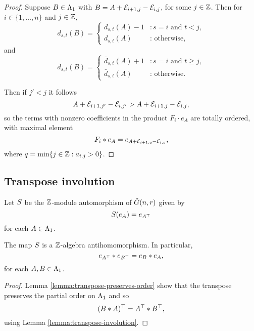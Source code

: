 \documentclass[a4paper, 11pt]{report}
\begin{document}
\begin{proof}
Suppose $B\in\Lambda_1{}$ with $B=A+\mathcal{E}_{i+1,j}-\mathcal{E}_{i,j}$, for some $j\in\mathbb{Z}$. Then for $i\in\{1,\ldots,n\}$ and $j\in\mathbb{Z}$,
\begin{equation*}
d_{s,t}{(B)} = \begin{cases}
d_{s,t}{(A)} - 1 &: s=i \text{ and } t<j,\\
d_{s,t}{(A)} &: \text{ otherwise,}
\end{cases}
\end{equation*}
and
\begin{equation*}
\bar{d}_{s,t}{(B)} = \begin{cases}
\bar{d}_{s,t}{(A)} + 1 &: s=i \text{ and } t\geq j,\\
\bar{d}_{s,t}{(A)} &: \text{ otherwise.}
\end{cases}
\end{equation*}

Then if $j'<j$ it follows
\begin{equation*}
A+\mathcal{E}_{i+1,j'}-\mathcal{E}_{i,j'} > A+\mathcal{E}_{i+1,j}-\mathcal{E}_{i,j},
\end{equation*}
so the terms with nonzero coefficients in the product $F_i\cdot e_A$ are totally ordered, with maximal element
\begin{equation*}
F_i\ast e_A = e_{A+\mathcal{E}_{i+1,q}-\mathcal{E}_{i,q}},
\end{equation*}
where $q=\min\{j\in\mathbb{Z}:a_{i,j}>0\}$.
\end{proof}

\subsection{Transpose involution}

Let $S{}$ be the $\mathbb{Z}$-module automorphism of $\hat{G}(n,r)$ given by
\begin{equation*}
S{(e_A)}=e_{A^\top}
\end{equation*}
for each $A\in\Lambda_1{}$.

\begin{lemma}\label{lemma:transpose-involution-generic}
The map $S{}$ is a $\mathbb{Z}$-algebra antihomomorphism. In particular,
\begin{equation*}
e_{A^\top}\ast e_{B^\top} = e_B\ast e_A,
\end{equation*}
for each $A,B\in\Lambda_1{}$.
\end{lemma}

\begin{proof}
Lemma \ref{lemma:transpose-preserves-order} show that the transpose preserves the partial order on $\Lambda_1{}$ and so
\begin{equation*}
(B\ast A)^\top = A^\top\ast B^\top,
\end{equation*}
using Lemma \ref{lemma:transpose-involution}.
\end{proof}
\end{document}
